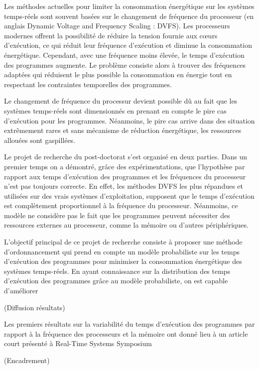 \documentclass{article}
\begin{document}
Les méthodes actuelles pour limiter la consommation énergétique sur les systèmes temps-réels sont 
souvent basées sur le changement de fréquence du processeur (en anglais Dynamic Voltage and Frequency 
Scaling : DVFS). Les processeurs modernes offrent la 
possibilité de réduire la tension fournie aux c\oe{}urs d'exécution, ce qui réduit leur fréquence d'exécution et 
diminue la consommation énergétique. Cependant, avec une fréquence moins élevée, le temps d'exécution  
des programmes augmente. Le problème consiste alors à trouver des fréquences adaptées qui réduisent le 
plus possible  la consommation en énergie tout en respectant les contraintes temporelles des programmes.


Le changement de fréquence du processur devient possible dû au fait que les systèmes temps-réels sont 
dimensionnés en prenant en compte le pire cas d'exécution pour les programmes. Néanmoins, le pire cas 
arrive dans des situation extrêmement rares et sans mécanisme de réduction énergétique, les ressources 
allouées sont gaspillées.
\vspace{.5cm}


Le projet de recherche du post-doctorat s'est organisé en deux parties. Dans un premier temps on a 
démontré, grâce des expérimentations, que l'hypothèse par rapport aux temps d'exécution des programmes 
et les fréquences du processeur n'est pas toujours correcte. En effet, les méthodes DVFS les plus répandues 
et utilisées sur des vrais systèmes d'exploitation, supposent que le temps d'exécution est complètement 
proportionnel à la fréquence du processeur. Néanmoins, ce modèle ne considère pas le fait que les 
programmes peuvent nécessiter des ressources externes au processeur, comme la mémoire ou d'autres 
périphériques.

L'objectif principal de ce projet de recherche consiste à proposer une méthode d'ordonnancement qui prend 
en compte un modèle probabiliste sur les temps d'exécution des programmes pour minimiser la 
consommation énergétique des systèmes temps-réels. En ayant connaissance sur la distribution des temps 
d'exécution des programmes grâce au modèle probabiliste, on est capable d'améliorer 


(Diffusion résultats)

Les premiers résultats sur la variabilité du temps d'exécution  des programmes par rapport à la fréquence 
des processeurs et la mémoire ont donné lieu à un article court présenté à Real-Time Systems Symposium

(Encadrement)
\end{document}
